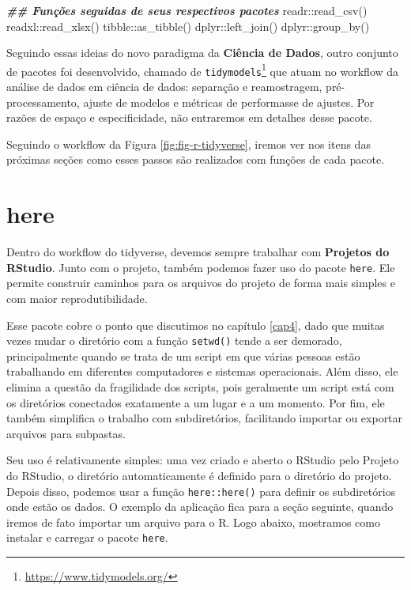 \documentclass[
]{book}
\newenvironment{Shaded}{\begin{snugshade}}{\end{snugshade}}
\newcommand{\DocumentationTok}[1]{\textcolor[rgb]{0.37,0.37,0.37}{\textbf{\textit{#1}}}}
\newcommand{\FunctionTok}[1]{\textcolor[rgb]{0,0,0}{#1}}
\newcommand{\NormalTok}[1]{#1}
\newcommand{\SpecialCharTok}[1]{\textcolor[rgb]{0,0,0}{#1}}
\renewcommand{\href}[2]{#2\footnote{\url{#1}}}
\begin{document}
\begin{Shaded}
\begin{Highlighting}[]
\DocumentationTok{\#\# Funções seguidas de seus respectivos pacotes}
\NormalTok{readr}\SpecialCharTok{::}\FunctionTok{read\_csv}\NormalTok{()}
\NormalTok{readxl}\SpecialCharTok{::}\FunctionTok{read\_xlsx}\NormalTok{()}
\NormalTok{tibble}\SpecialCharTok{::}\FunctionTok{as\_tibble}\NormalTok{()}
\NormalTok{dplyr}\SpecialCharTok{::}\FunctionTok{left\_join}\NormalTok{()}
\NormalTok{dplyr}\SpecialCharTok{::}\FunctionTok{group\_by}\NormalTok{()}
\end{Highlighting}
\end{Shaded}

Seguindo essas ideias do novo paradigma da \textbf{Ciência de Dados}, outro conjunto de pacotes foi desenvolvido, chamado de \href{https://www.tidymodels.org/}{\texttt{tidymodels}} que atuam no workflow da análise de dados em ciência de dados: separação e reamostragem, pré-processamento, ajuste de modelos e métricas de performasse de ajustes. Por razões de espaço e especificidade, não entraremos em detalhes desse pacote.

Seguindo o workflow da Figura \ref{fig:fig-r-tidyverse}, iremos ver nos itens das próximas seções como esses passos são realizados com funções de cada pacote.

\hypertarget{here}{%
\section{here}\label{here}}

Dentro do workflow do tidyverse, devemos sempre trabalhar com \textbf{Projetos do RStudio}. Junto com o projeto, também podemos fazer uso do pacote \texttt{here}. Ele permite construir caminhos para os arquivos do projeto de forma mais simples e com maior reprodutibilidade.

Esse pacote cobre o ponto que discutimos no capítulo \ref{cap4}, dado que muitas vezes mudar o diretório com a função \texttt{setwd()} tende a ser demorado, principalmente quando se trata de um script em que várias pessoas estão trabalhando em diferentes computadores e sistemas operacionais. Além disso, ele elimina a questão da fragilidade dos scripts, pois geralmente um script está com os diretórios conectados exatamente a um lugar e a um momento. Por fim, ele também simplifica o trabalho com subdiretórios, facilitando importar ou exportar arquivos para subpastas.

Seu uso é relativamente simples: uma vez criado e aberto o RStudio pelo Projeto do RStudio, o diretório automaticamente é definido para o diretório do projeto. Depois disso, podemos usar a função \texttt{here::here()} para definir os subdiretórios onde estão os dados. O exemplo da aplicação fica para a seção seguinte, quando iremos de fato importar um arquivo para o R. Logo abaixo, mostramos como instalar e carregar o pacote \texttt{here}.
\end{document}
